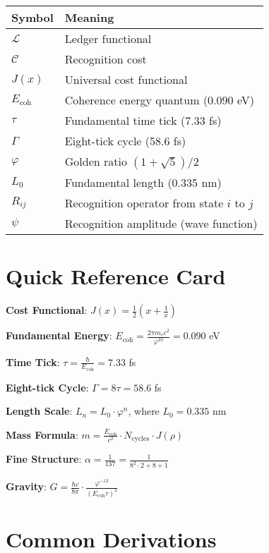 \documentclass[12pt,a4paper]{article}
\newcommand{\Ecoh}{E_{\text{coh}}}
\newcommand{\tick}{\tau}
\newcommand{\voxel}{L_0}
\newcommand{\chronon}{\Gamma}
\newcommand{\golden}{\varphi}
\theoremstyle{definition}
\begin{document}
\begin{tabular}{ll}
\toprule
\textbf{Symbol} & \textbf{Meaning} \\
\midrule
$\mathcal{L}$ & Ledger functional \\
$\mathcal{C}$ & Recognition cost \\
$J(x)$ & Universal cost functional \\
$\Ecoh$ & Coherence energy quantum (0.090 eV) \\
$\tick$ & Fundamental time tick (7.33 fs) \\
$\chronon$ & Eight-tick cycle (58.6 fs) \\
$\golden$ & Golden ratio $(1+\sqrt{5})/2$ \\
$\voxel$ & Fundamental length (0.335 nm) \\
$R_{ij}$ & Recognition operator from state $i$ to $j$ \\
$\psi$ & Recognition amplitude (wave function) \\
\bottomrule
\end{tabular}

\section{Quick Reference Card}

\begin{tcolorbox}[colback=yellow!10,colframe=orange!50,title=Essential Equations]
\textbf{Cost Functional}: $J(x) = \frac{1}{2}(x + \frac{1}{x})$

\textbf{Fundamental Energy}: $\Ecoh = \frac{2\pi m_e c^2}{\golden^{10}} = 0.090$ eV

\textbf{Time Tick}: $\tick = \frac{\hbar}{\Ecoh} = 7.33$ fs

\textbf{Eight-tick Cycle}: $\chronon = 8\tick = 58.6$ fs

\textbf{Length Scale}: $L_n = \voxel \cdot \golden^n$, where $\voxel = 0.335$ nm

\textbf{Mass Formula}: $m = \frac{\Ecoh}{c^2} \cdot N_{\text{cycles}} \cdot J(\rho)$

\textbf{Fine Structure}: $\alpha = \frac{1}{137} = \frac{1}{8^2 \cdot 2 + 8 + 1}$

\textbf{Gravity}: $G = \frac{\hbar c}{8\pi} \cdot \frac{\golden^{-13}}{(\Ecoh \tau)^2}$
\end{tcolorbox}

\section{Common Derivations}
\end{document}
